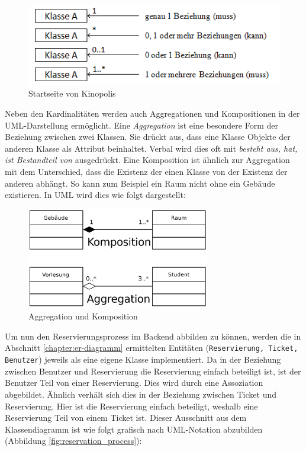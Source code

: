 		\begin{figure}[H]
			\centering 
			\includegraphics[width=12cm]{img/UmlKardinalitaet.png}
			\captionsetup{format=hang}
			\centering\caption[Kardinalitäten nach UML-Notation]{\label{fig:Kardinalitaeten.UML}Startseite von Kinopolis\footnotemark}
		\end{figure}
		
		Neben den Kardinalitäten werden auch Aggregationen und Kompositionen in der UML-Darstellung ermöglicht. Eine \textit{Aggregation} ist eine besondere Form der Beziehung zwischen zwei Klassen. Sie drückt aus, dass eine Klasse Objekte der anderen Klasse als Attribut beinhaltet. Verbal wird dies oft mit \textit{besteht aus, hat, ist Bestandteil von} ausgedrückt. Eine Komposition ist ähnlich zur Aggregation mit dem Unterschied, dass die Existenz der einen Klasse von der Existenz der anderen abhängt. So kann zum Beispiel ein Raum nicht ohne ein Gebäude existieren. In UML wird dies wie folgt dargestellt:
		
		\begin{figure}[H]
			\centering 
			\includegraphics[width=8cm]{img/aggregation_komposition.JPG}
			\captionsetup{format=hang}
			\caption[Aggregation und Komposition]{\label{fig:aggreagtion_komposition}Aggregation und Komposition}
		\end{figure}
		
		Um nun den Reservierungsprozess im Backend abbilden zu können, werden die in Abschnitt \ref{chapter:er-diagramm} ermittelten Entitäten (\texttt{Reservierung, Ticket, Benutzer}) jeweils als eine eigene Klasse implementiert. Da in der Beziehung zwischen Benutzer und Reservierung die Reservierung einfach beteiligt ist, ist der Benutzer Teil von einer Reservierung. Dies wird durch eine Assoziation abgebildet. Ähnlich verhält sich dies in der Beziehung zwischen Ticket und Reservierung. Hier ist die Reservierung einfach beteiligt, weshalb eine Reservierung Teil von einem Ticket ist. Dieser Ausschnitt aus dem Klassendiagramm ist wie folgt grafisch nach UML-Notation abzubilden (Abbildung \ref{fig:reservation_process}):
		
